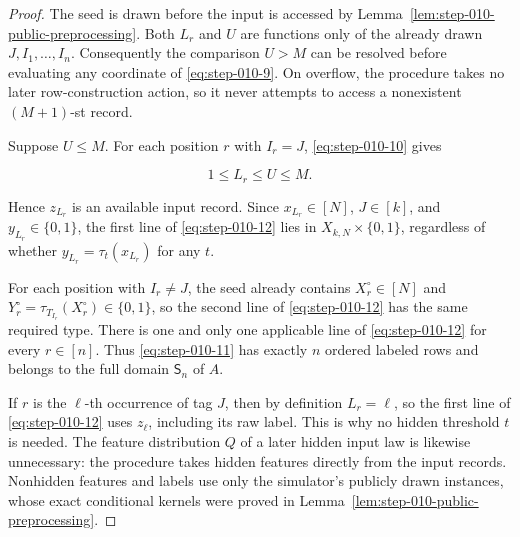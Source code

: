 \begin{proof}
The seed is drawn before the input is accessed by
Lemma~\ref{lem:step-010-public-preprocessing}. Both \(L_r\) and \(U\) are
functions only of the already drawn \(J,I_1,\ldots,I_n\). Consequently the
comparison \(U>M\) can be resolved before evaluating any coordinate of
\eqref{eq:step-010-9}. On overflow, the procedure takes no later row-construction action, so
it never attempts to access a nonexistent \((M+1)\)-st record.

Suppose \(U\le M\). For each position \(r\) with \(I_r=J\), \eqref{eq:step-010-10} gives

\[
  1\le L_r\le U\le M.
\tag{S10.13}\label{eq:step-010-13}
\]

Hence \(z_{L_r}\) is an available input record. Since
\(x_{L_r}\in[N]\), \(J\in[k]\), and \(y_{L_r}\in\{0,1\}\), the first line
of \eqref{eq:step-010-12} lies in \(X_{k,N}\times\{0,1\}\), regardless of whether
\(y_{L_r}=\tau_t(x_{L_r})\) for any \(t\).

For each position with \(I_r\ne J\), the seed already contains
\(X_r^\circ\in[N]\) and
\(Y_r^\circ=\tau_{T_{I_r}}(X_r^\circ)\in\{0,1\}\), so the second line of
\eqref{eq:step-010-12} has the same required type. There is one and only one applicable line
of \eqref{eq:step-010-12} for every \(r\in[n]\). Thus \eqref{eq:step-010-11} has exactly \(n\) ordered labeled
rows and belongs to the full domain \(\mathsf S_n\) of \(A\).

If \(r\) is the \(\ell\)-th occurrence of tag \(J\), then by definition
\(L_r=\ell\), so the first line of \eqref{eq:step-010-12} uses \(z_\ell\), including its raw
label. This is why no hidden threshold \(t\) is needed. The feature
distribution \(Q\) of a later hidden input law is likewise unnecessary:
the procedure takes hidden features directly from the input records.
Nonhidden features and labels use only the simulator's publicly drawn
instances, whose exact conditional kernels were proved in
Lemma~\ref{lem:step-010-public-preprocessing}.
\end{proof}

